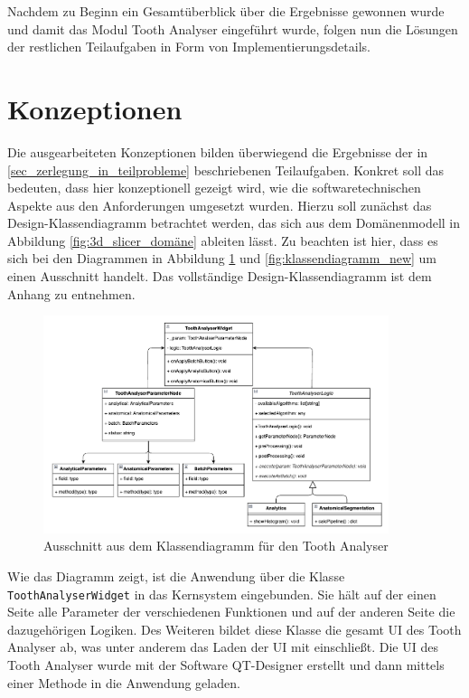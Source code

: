 Nachdem zu Beginn ein Gesamtüberblick über die Ergebnisse gewonnen wurde und
damit das Modul Tooth Analyser eingeführt wurde, folgen nun die Lösungen der restlichen
Teilaufgaben in Form von Implementierungsdetails.

\pagebreak

\section{Konzeptionen}
\label{sec:konzeptionen} Die ausgearbeiteten Konzeptionen bilden überwiegend die
Ergebnisse der in \ref{sec_zerlegung_in_teilprobleme} beschriebenen Teilaufgaben.
Konkret soll das bedeuten, dass hier konzeptionell gezeigt wird, wie die softwaretechnischen
Aspekte aus den Anforderungen umgesetzt wurden. Hierzu soll zunächst das Design-Klassendiagramm
betrachtet werden, das sich aus dem Domänenmodell in Abbildung \ref{fig:3d_slicer_domäne}
ableiten lässt. Zu beachten ist hier, dass es sich bei den Diagrammen in Abbildung
\ref{fig:klassendiagramm} und \ref{fig:klassendiagramm_new} um einen Ausschnitt handelt.
Das vollständige Design-Klassendiagramm ist dem Anhang zu entnehmen.

\begin{figure}[h]
	\centering
	\includegraphics[width=0.9\textwidth]{
		img/tooth_analyser_class_diagram_light.png
	}
	\caption{Ausschnitt aus dem Klassendiagramm für den Tooth Analyser}
	\label{fig:klassendiagramm}
\end{figure}

Wie das Diagramm zeigt, ist die Anwendung über die Klasse \texttt{ToothAnalyserWidget}
in das Kernsystem eingebunden. Sie hält auf der einen Seite alle Parameter der
verschiedenen Funktionen und auf der anderen Seite die dazugehörigen Logiken. Des
Weiteren bildet diese Klasse die gesamt \ac{UI} des Tooth Analyser ab, was unter
anderem das Laden der \ac{UI} mit einschließt. Die \ac{UI} des Tooth Analyser
wurde mit der Software QT-Designer erstellt und dann mittels einer Methode in
die Anwendung geladen.

